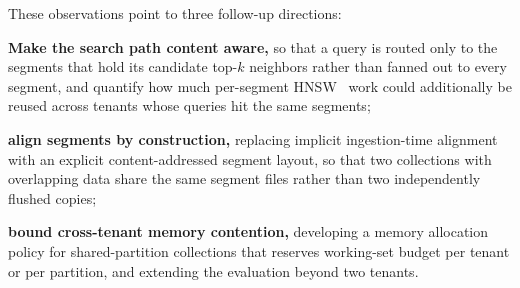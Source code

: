  These observations point to three follow-up
directions:
\begin{enumerate*}[label=(\arabic*)]
    \item \textbf{Make the search path content aware,} so that a
    query is routed only to the segments that hold its candidate
    top-$k$ neighbors rather than fanned out to every segment,
    and quantify how much per-segment HNSW~\cite{malkov2018hnsw}
    work could additionally be reused across tenants whose
    queries hit the same segments;
    \item \textbf{align segments by construction,} replacing
    implicit ingestion-time alignment with an explicit
    content-addressed segment layout, so that two collections
    with overlapping data share the same segment files rather
    than two independently flushed copies;
    \item \textbf{bound cross-tenant memory contention,}
    developing a memory allocation policy for shared-partition
    collections that reserves working-set budget per tenant or
    per partition, and extending the evaluation beyond two
    tenants.
\end{enumerate*}

